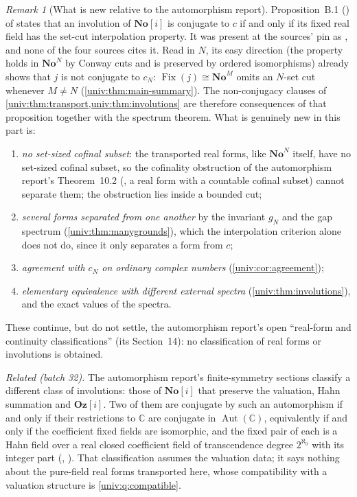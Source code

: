 \documentclass[11pt,letterpaper]{article}
\numberwithin{equation}{section}
\theoremstyle{definition}
\theoremstyle{remark}
\newtheorem{remark}[remark]{Remark}
\newcommand{\No}{\mathbf{No}}
\newcommand{\NoM}{\No^{M}}
\newcommand{\NoN}{\No^{N}}
\newcommand{\C}{\mathbb C}
\newcommand{\Fix}{\operatorname{Fix}}
\newcommand{\Aut}{\operatorname{Aut}}
\begin{document}
\begin{remark}[What is new relative to the automorphism report]\label{univ:rem:whatisnew}
Proposition~B.1 () of
 states that an involution
of $\No[i]$ is conjugate to $c$ if and only if its fixed real field has the
set-cut interpolation property. It was present at the sources' pin as
, and none of the four sources cites it. Read
in $N$, its easy direction (the property holds in $\NoN$ by Conway cuts and is
preserved by ordered isomorphisms) already shows that $j$ is not conjugate to
$c_N$: $\Fix(j)\cong\NoM$ omits an $N$-set cut whenever $M\ne N$
(\cref{univ:thm:main-summary}). The non-conjugacy clauses of
\cref{univ:thm:transport,univ:thm:involutions} are therefore consequences of
that proposition together with the spectrum theorem. What is genuinely new in
this part is:
\begin{enumerate}[label=(\alph*)]
\item \emph{no set-sized cofinal subset}: the transported real forms, like
$\NoN$ itself, have no set-sized cofinal subset, so the cofinality obstruction
of the automorphism report's Theorem~10.2
(, a real form with a countable cofinal
subset) cannot separate them; the obstruction lies inside a bounded cut;
\item \emph{several forms separated from one another} by the invariant $g_N$
and the gap spectrum (\cref{univ:thm:manygrounds}), which the interpolation
criterion alone does not do, since it only separates a form from $c$;
\item \emph{agreement with $c_N$ on ordinary complex numbers}
(\cref{univ:cor:agreement});
\item \emph{elementary equivalence with different external spectra}
(\cref{univ:thm:involutions}), and the exact values of the spectra.
\end{enumerate}
These continue, but do not settle, the automorphism report's open
``real-form and continuity classifications'' (its Section~14): no
classification of real forms or involutions is obtained.
\end{remark}

\emph{Related (batch 32).} The automorphism report's finite-symmetry sections
classify a different class of involutions: those of $\No[i]$ that preserve the
valuation, Hahn summation and $\mathbf{Oz}[i]$. Two of them are conjugate by such an
automorphism if and only if their restrictions to $\C$ are conjugate in $\Aut(\C)$,
equivalently if and only if the coefficient fixed fields are isomorphic, and
the fixed pair of each is a Hahn field over a real closed coefficient field of
transcendence degree $2^{\aleph_0}$ with its integer part
(, ). That
classification assumes the valuation data; it says nothing about the
pure-field real forms transported here, whose compatibility with a valuation
structure is \cref{univ:q:compatible}.
\end{document}

